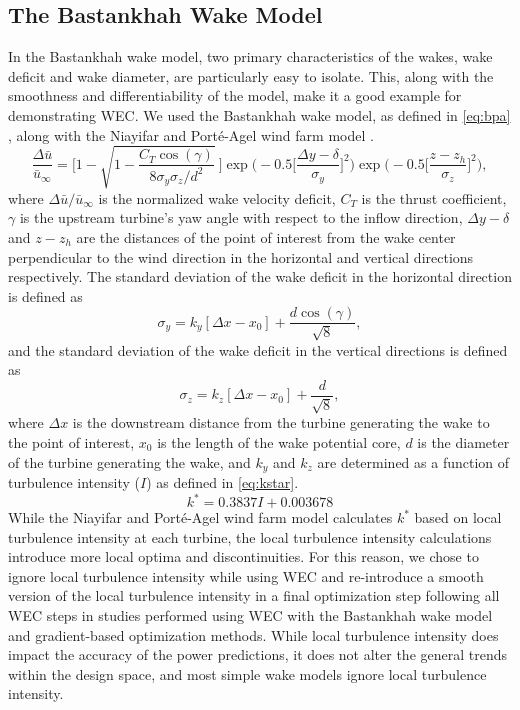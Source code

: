 \documentclass{jpconf}
\begin{document}
\subsection{The Bastankhah Wake Model}
In the Bastankhah wake model, two primary characteristics of the wakes, wake deficit and wake diameter, are particularly easy to isolate. This, along with the smoothness and differentiability of the model, make it a good example for demonstrating WEC. We used the Bastankhah wake model, as defined in \cref{eq:bpa} \cite{bastankhah2016}, along with the Niayifar and Port\'e-Agel wind farm model \cite{niayifar2016}.
%
\begin{equation}
	\frac{\Delta \bar{u}}{\bar{u}_{\infty}} = \Bigg[1-\sqrt{1-\frac{C_T \cos{(\gamma)}}{8 \sigma_y \sigma_z/d^2}}~\Bigg] \exp{\bigg(-0.5\Big[\frac{\Delta y-\delta}{\sigma_y}\Big]^2\bigg)}\exp{\bigg(-0.5\Big[\frac{z-z_h}{\sigma_z}\Big]^2\bigg)},
	 \label{eq:bpa}
\end{equation}
%
where $\Delta \bar{u} / \bar{u}_{\infty}$ is the normalized wake velocity deficit, $C_T$ is the thrust coefficient, $\gamma$ is the upstream turbine's yaw angle with respect to the inflow direction, $\Delta y-\delta$ and $z-z_h$ are the distances of the point of interest from the wake center perpendicular to the wind direction in the horizontal and vertical directions respectively. The standard deviation of the wake deficit in the horizontal direction is defined as
%
\begin{equation}\label{eq:sigmay}
	\sigma_y = k_y [\Delta x - x_0] + \frac{d \cos{(\gamma)}}{\sqrt{8}},
\end{equation}
and the standard deviation of the wake deficit in the vertical directions is defined as
\begin{equation}\label{eq:sigmaz}
	\sigma_z = k_z [\Delta x - x_0] + \frac{d}{\sqrt{8}},
\end{equation}
%
where $\Delta x$ is the downstream distance from the turbine generating the wake to the point of interest, $x_0$ is the length of the wake potential core, $d$ is the diameter of the turbine generating the wake, and $k_y$ and $k_z$ are determined as a function of turbulence intensity ($I$) as defined in \cref{eq:kstar}\cite{niayifar2016}.
%
\begin{equation}\label{eq:kstar}
	k^* = 0.3837I + 0.003678
\end{equation}
%
While the Niayifar and Port\'e-Agel wind farm model calculates $k^*$ based on local turbulence intensity at each turbine, the local turbulence intensity calculations introduce more local optima and discontinuities. For this reason, we chose to ignore local turbulence intensity while using WEC and re-introduce a smooth version of the local turbulence intensity in a final optimization step following all WEC steps in studies performed using WEC with the Bastankhah wake model and gradient-based optimization methods. While local turbulence intensity does impact the accuracy of the power predictions, it does not alter the general trends within the design space, and most simple wake models ignore local turbulence intensity. 
\end{document}
